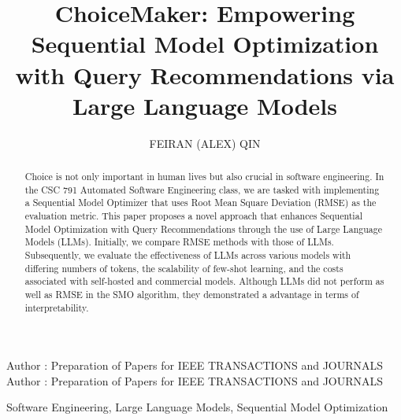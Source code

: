 \documentclass{ieeeaccess}
\begin{document}

\title{ChoiceMaker: Empowering Sequential Model Optimization with Query Recommendations via Large Language Models}
\author{\uppercase{Feiran (Alex) Qin}}
\address[1]{Computer Science Department, North Carolina State University, Raleigh, NC 27695, USA}


\tfootnote{
}

\markboth
{Author \headeretal: Preparation of Papers for IEEE TRANSACTIONS and JOURNALS}
{Author \headeretal: Preparation of Papers for IEEE TRANSACTIONS and JOURNALS}


\begin{abstract}
    Choice is not only important in human lives but also crucial in software engineering. In the CSC 791 Automated Software Engineering class, we are tasked with implementing a Sequential Model Optimizer that uses Root Mean Square Deviation (RMSE) as the evaluation metric. This paper proposes a novel approach that enhances Sequential Model Optimization with Query Recommendations through the use of Large Language Models (LLMs). Initially, we compare RMSE methods with those of LLMs. Subsequently, we evaluate the effectiveness of LLMs across various models with differing numbers of tokens, the scalability of few-shot learning, and the costs associated with self-hosted and commercial models. Although LLMs did not perform as well as RMSE in the SMO algorithm, they demonstrated a advantage in terms of interpretability.
\end{abstract}

\begin{keywords}
Software Engineering, Large Language Models, Sequential Model Optimization
\end{keywords}

\titlepgskip=-15pt

\maketitle
\end{document}
